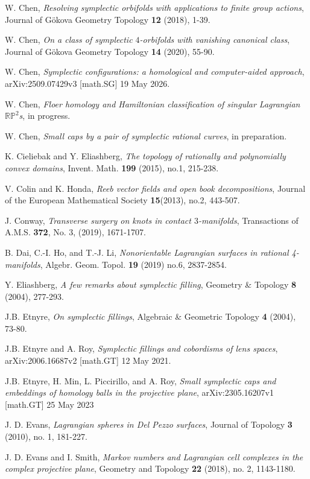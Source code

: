 \documentclass[11pt]{amsart}
\theoremstyle{plain}
\numberwithin{theorem}{section}
\theoremstyle{definition}
\newcommand{\R}{{\mathbb R}}
\renewcommand{\P}{{\mathbb P}}
\begin{document}
\begin{thebibliography}{}
 W. Chen, {\em Resolving symplectic orbifolds with applications to finite group actions}, 
Journal of G\"{o}kova Geometry Topology {\bf 12} (2018), 1-39.

 W. Chen, {\em On a class of symplectic $4$-orbifolds with vanishing canonical class}, Journal of G\"{o}kova Geometry Topology {\bf 14} (2020), 55-90.

 W. Chen,  {\em Symplectic configurations: a homological and computer-aided approach}, arXiv:2509.07429v3 [math.SG] 19 May 2026.

 W. Chen, {\em Floer homology and Hamiltonian classification of singular Lagrangian $\R\P^2$s}, in progress. 

 W. Chen, {\em Small caps by a pair of symplectic rational curves}, in preparation. 

 K. Cieliebak and Y. Eliashberg, {\em The topology of rationally and polynomially convex domains}, Invent. Math. {\bf 199} (2015), no.1, 215-238.

 V. Colin and K. Honda, {\em Reeb vector fields and open book decompositions},
Journal of the European Mathematical Society {\bf 15}(2013), no.2, 443-507.

 J. Conway, {\em Transverse surgery on knots in contact $3$-manifolds}, Transactions of
A.M.S. {\bf 372}, No. 3, (2019), 1671-1707. 

 B. Dai, C.-I. Ho, and T.-J. Li, {\em Nonorientable Lagrangian surfaces in rational
4-manifolds}, Algebr. Geom. Topol. {\bf 19} (2019) no.6, 2837-2854.

 Y. Eliashberg, {\em A few remarks about symplectic filling}, Geometry \& Topology 
{\bf 8} (2004), 277-293.

 J.B. Etnyre, {\em On symplectic fillings}, Algebraic \& Geometric Topology {\bf 4} (2004), 73-80.

 J.B. Etnyre and A. Roy, {\em Symplectic fillings and cobordisms of lens spaces},
arXiv:2006.16687v2 [math.GT] 12 May 2021.

 J.B. Etnyre, H. Min, L. Piccirillo, and A. Roy, {\em Small symplectic caps and embeddings of homology balls in the projective plane}, arXiv:2305.16207v1 [math.GT] 25 May 2023

 J. D. Evans, {\em Lagrangian spheres in Del Pezzo surfaces}, Journal of Topology {\bf 3} (2010), no. 1, 181-227. 

 J. D. Evans and I. Smith, {\em Markov numbers and Lagrangian cell complexes in the complex 
projective plane},  Geometry and Topology {\bf 22} (2018), no. 2, 1143-1180.


\end{thebibliography}
\end{document}
